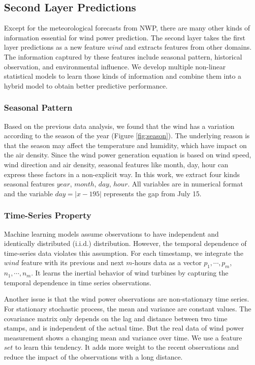 \documentclass[conference]{IEEEtran}
\begin{document}
\subsection{Second Layer Predictions}
Except for the meteorological forecasts from NWP, there are many other kinds of information essential for wind power prediction. The second layer takes the first layer predictions as a new feature $wind$ and extracts features from other domains. The information captured by these features include seasonal pattern, historical observation, and environmental influence. We develop multiple non-linear statistical models to learn those kinds of information and combine them into a hybrid model to obtain better predictive performance. 

\subsubsection{Seasonal Pattern}
Based on the previous data analysis, we found that the wind has a variation according to the season of the year (Figure \ref{fig:season}). The underlying reason is that the season may affect the temperature and humidity, which have impact on the air density. Since the wind power generation equation is based on wind speed, wind direction and air density, seasonal features like month, day, hour can express these factors in a non-explicit way. In this work, we extract four kinds seasonal features $year$, $month$, $day$, $hour$. All variables are in numerical format and the variable $day = |x-195|$ represents the gap from July 15. 

\subsubsection{Time-Series Property}
Machine learning models assume observations to have independent and identically distributed (i.i.d.) distribution. However, the temporal dependence of time-series data violates this assumption. For each timestamp, we integrate the $wind$ feature with its previous and next $m$-hours data as a vector $p_1, \cdots, p_m$, $n_1, \cdots, n_m$. It learns the inertial behavior of wind turbines by capturing the temporal dependence in time series observations.  

Another issue is that the wind power observations are non-stationary time series. For stationary stochastic process, the mean and variance are constant values. The covariance matrix only depends on the lag and distance between two time stamps, and is independent of the actual time. But the real data of wind power measurement shows a changing mean and variance over time. We use a feature $set$ to learn this tendency. It adds more weight to the recent observations and reduce the impact of the observations with a long distance. 
\end{document}
